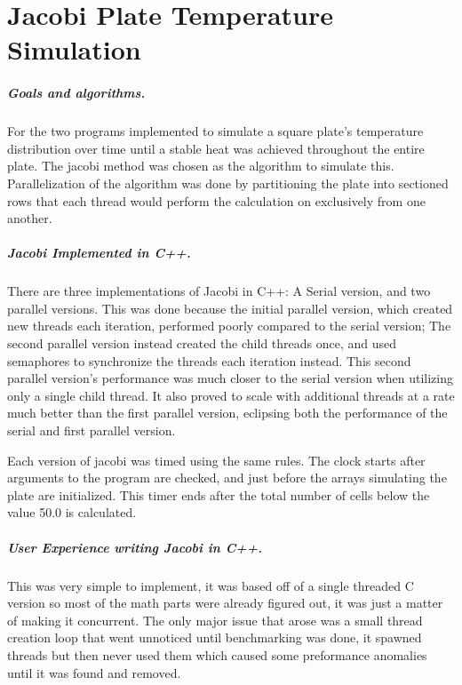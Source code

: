 \chapter{Jacobi Plate Temperature Simulation}
\paragraph{Goals and algorithms.}
For the two programs implemented to simulate a square plate's temperature
distribution over time until a stable heat was achieved throughout the
entire plate. The jacobi method was chosen as the algorithm to simulate this.
Parallelization of the algorithm was done by partitioning the plate into
sectioned rows that each thread would perform the calculation on exclusively
from one another.

\paragraph{Jacobi Implemented in C++.}
There are three implementations of Jacobi in C++: A Serial version, and two
parallel versions. This was done because the initial parallel version, which
created new threads each iteration, performed poorly compared to the serial
version; The second parallel version instead created the child threads once,
and used semaphores to synchronize the threads each iteration instead. This
second parallel version's performance was much closer to the serial version
when utilizing only a single child thread. It also proved to scale with
additional threads at a rate much better than the first parallel version,
eclipsing both the performance of the serial and first parallel version.

\par Each version of jacobi was timed using the same rules. The clock starts
after arguments to the program are checked, and just before the arrays
simulating the plate are initialized. This timer ends after the total number
of cells below the value 50.0 is calculated.

\paragraph{User Experience writing Jacobi in C++.}
This was very simple to implement, it was based off of a single threaded C
version so most of the math parts were already figured out, it was just a
matter of making it concurrent. The only major issue that arose was a small
thread creation loop that went unnoticed until benchmarking was done, it
spawned threads but then never used them which caused some preformance
anomalies until it was found and removed.


